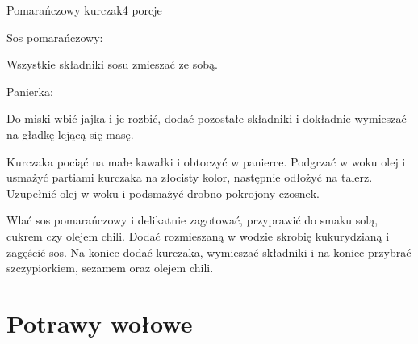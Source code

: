 \documentclass[a4paper,12pt]{article}
\begin{document}
\begin{recipe}{Pomarańczowy kurczak}{4 porcje}{}

\freeform%
Sos pomarańczowy:

Wszystkie składniki sosu zmieszać ze sobą.

\freeform%
Panierka:

Do miski wbić jajka i je rozbić, dodać pozostałe składniki i dokładnie wymieszać na gładkę lejącą się masę.


Kurczaka pociąć na małe kawałki i obtoczyć w panierce. Podgrzać w woku olej i usmażyć partiami kurczaka na złocisty kolor, następnie odłożyć na talerz. Uzupełnić olej w woku i podsmażyć drobno pokrojony czosnek. 

\freeform%
Wlać sos pomarańczowy i delikatnie zagotować, przyprawić do smaku solą, cukrem czy olejem chili. Dodać rozmieszaną w wodzie skrobię kukurydzianą i zagęścić sos. Na koniec dodać kurczaka, wymieszać składniki i na koniec przybrać szczypiorkiem, sezamem oraz olejem chili.

\end{recipe}

\newpage

\section{Potrawy wołowe}
\end{document}
